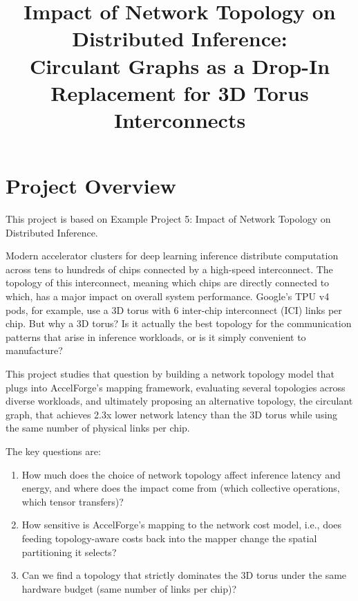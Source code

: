 \documentclass[conference,onecolumn]{IEEEtran}
\begin{document}
\title{Impact of Network Topology on Distributed Inference:\\Circulant Graphs as a Drop-In Replacement for 3D Torus Interconnects}

\author{
\and
{}
}

\maketitle


\section{Project Overview}

This project is based on Example Project 5: Impact of Network Topology on Distributed Inference.

Modern accelerator clusters for deep learning inference distribute computation across tens to hundreds of chips connected by a high-speed interconnect. The topology of this interconnect, meaning which chips are directly connected to which, has a major impact on overall system performance. Google's TPU v4 pods, for example, use a 3D torus with 6 inter-chip interconnect (ICI) links per chip. But why a 3D torus? Is it actually the best topology for the communication patterns that arise in inference workloads, or is it simply convenient to manufacture?

This project studies that question by building a network topology model that plugs into AccelForge's mapping framework, evaluating several topologies across diverse workloads, and ultimately proposing an alternative topology, the circulant graph, that achieves 2.3x lower network latency than the 3D torus while using the same number of physical links per chip.

The key questions are:
\begin{enumerate}
    \item How much does the choice of network topology affect inference latency and energy, and where does the impact come from (which collective operations, which tensor transfers)?
    \item How sensitive is AccelForge's mapping to the network cost model, i.e., does feeding topology-aware costs back into the mapper change the spatial partitioning it selects?
    \item Can we find a topology that strictly dominates the 3D torus under the same hardware budget (same number of links per chip)?
\end{enumerate}
\end{document}
